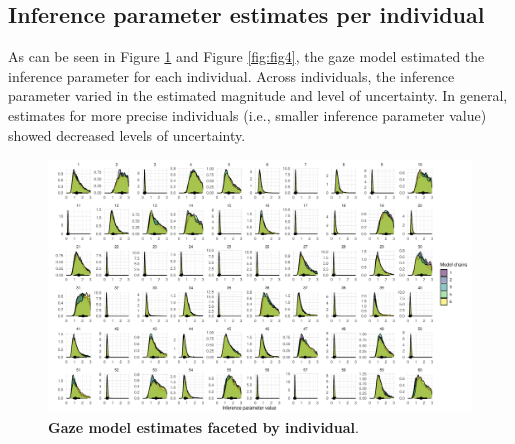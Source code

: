 \documentclass[
  man,floatsintext]{apa7}
\begin{document}
\hypertarget{inference-parameter-estimates-per-individual}{%
\subsection{Inference parameter estimates per individual}\label{inference-parameter-estimates-per-individual}}

As can be seen in Figure \ref{fig:fig3} and Figure \ref{fig:fig4}, the gaze model estimated the inference parameter for each individual. Across individuals, the inference parameter varied in the estimated magnitude and level of uncertainty. In general, estimates for more precise individuals (i.e., smaller inference parameter value) showed decreased levels of uncertainty.



\begin{figure}[H]

{\centering \includegraphics[width=1\linewidth]{../figures/supplements_gazemodel_facetedinference} 

}

\caption{\textbf{Gaze model estimates faceted by individual}.}\label{fig:fig3}
\end{figure}
\end{document}
